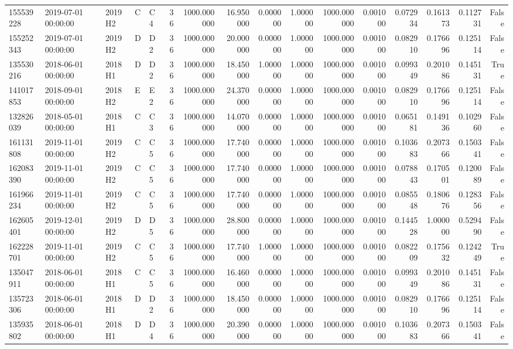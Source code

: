 \begin{tabular}{lllllrrrrrrrrrrr}
155539228 & 2019-07-01 00:00:00 & 2019H2 & C & C4 & 36 & 1000.000000 & 16.950000 & 0.000000 & 1.000000 & 1000.000000 & 0.001000 & 0.072934 & 0.161373 & 0.112731 & False \\
155252343 & 2019-07-01 00:00:00 & 2019H2 & D & D2 & 36 & 1000.000000 & 20.000000 & 0.000000 & 1.000000 & 1000.000000 & 0.001000 & 0.082910 & 0.176696 & 0.125114 & False \\
135530216 & 2018-06-01 00:00:00 & 2018H1 & D & D2 & 36 & 1000.000000 & 18.450000 & 1.000000 & 1.000000 & 1000.000000 & 0.001000 & 0.099349 & 0.201086 & 0.145131 & True \\
141017853 & 2018-09-01 00:00:00 & 2018H2 & E & E2 & 36 & 1000.000000 & 24.370000 & 0.000000 & 1.000000 & 1000.000000 & 0.001000 & 0.082910 & 0.176696 & 0.125114 & False \\
132826039 & 2018-05-01 00:00:00 & 2018H1 & C & C3 & 36 & 1000.000000 & 14.070000 & 0.000000 & 1.000000 & 1000.000000 & 0.001000 & 0.065181 & 0.149136 & 0.102960 & False \\
161131808 & 2019-11-01 00:00:00 & 2019H2 & C & C5 & 36 & 1000.000000 & 17.740000 & 0.000000 & 1.000000 & 1000.000000 & 0.001000 & 0.103683 & 0.207366 & 0.150341 & False \\
162083390 & 2019-11-01 00:00:00 & 2019H2 & C & C5 & 36 & 1000.000000 & 17.740000 & 0.000000 & 1.000000 & 1000.000000 & 0.001000 & 0.078843 & 0.170501 & 0.120089 & False \\
161966234 & 2019-11-01 00:00:00 & 2019H2 & C & C5 & 36 & 1000.000000 & 17.740000 & 0.000000 & 1.000000 & 1000.000000 & 0.001000 & 0.085548 & 0.180676 & 0.128356 & False \\
162605401 & 2019-12-01 00:00:00 & 2019H2 & D & D5 & 36 & 1000.000000 & 28.800000 & 0.000000 & 1.000000 & 1000.000000 & 0.001000 & 0.144528 & 1.000000 & 0.529490 & False \\
162228701 & 2019-11-01 00:00:00 & 2019H2 & C & C5 & 36 & 1000.000000 & 17.740000 & 1.000000 & 1.000000 & 1000.000000 & 0.001000 & 0.082209 & 0.175632 & 0.124249 & True \\
135047911 & 2018-06-01 00:00:00 & 2018H1 & C & C5 & 36 & 1000.000000 & 16.460000 & 0.000000 & 1.000000 & 1000.000000 & 0.001000 & 0.099349 & 0.201086 & 0.145131 & False \\
135723306 & 2018-06-01 00:00:00 & 2018H1 & D & D2 & 36 & 1000.000000 & 18.450000 & 0.000000 & 1.000000 & 1000.000000 & 0.001000 & 0.082910 & 0.176696 & 0.125114 & False \\
135935802 & 2018-06-01 00:00:00 & 2018H1 & D & D4 & 36 & 1000.000000 & 20.390000 & 0.000000 & 1.000000 & 1000.000000 & 0.001000 & 0.103683 & 0.207366 & 0.150341 & False \\

\end{tabular}
